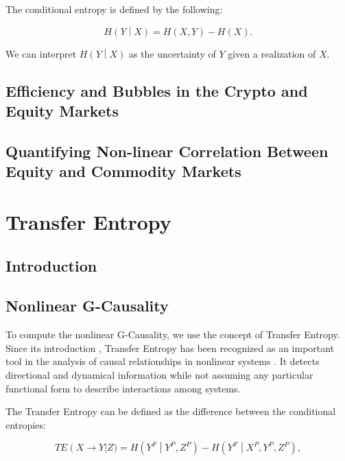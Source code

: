 \documentclass[]{book}
\theoremstyle{definition}
\theoremstyle{definition}
\theoremstyle{definition}
\theoremstyle{remark}
\begin{document}
The conditional entropy is defined by the following:

\begin{equation}
H\left(Y\middle\vert X\right) = H(X,Y) - H(X).
\end{equation}

We can interpret \(H\left(Y\middle\vert X\right)\) as the uncertainty of
\(Y\) given a realization of \(X\).

\section{Efficiency and Bubbles in the Crypto and Equity
Markets}\label{efficiency-and-bubbles-in-the-crypto-and-equity-markets}

\section{Quantifying Non-linear Correlation Between Equity and Commodity
Markets}\label{quantifying-non-linear-correlation-between-equity-and-commodity-markets}

\chapter{Transfer Entropy}\label{transfer-entropy}

\section{Introduction}\label{introduction-2}

\section{Nonlinear G-Causality}\label{nonlinearG}

To compute the nonlinear G-Causality, we use the concept of Transfer
Entropy. Since its introduction \citep{PhysRevLett.85.461}, Transfer
Entropy has been recognized as an important tool in the analysis of
causal relationships in nonlinear systems \citep{citeulike:1447442}. It
detects directional and dynamical information
\citep{10.1371/journal.pone.0109462} while not assuming any particular
functional form to describe interactions among systems.

The Transfer Entropy can be defined as the difference between the
conditional entropies:

\begin{equation}
 TE\left(X \rightarrow Y\right \vert Z) =  H\left(Y^F\middle\vert Y^P,Z^P\right) - H\left(Y^F\middle\vert X^P, Y^P,Z^P\right),
\label{eq:TE}
\end{equation}
\end{document}
